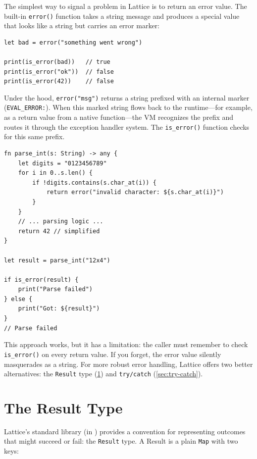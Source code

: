 The simplest way to signal a problem in Lattice is to return an error value. The built-in \lstinline|error()| function takes a string message and produces a special value that looks like a string but carries an error marker:

\begin{lstlisting}[language=Lattice, caption={Creating and detecting error values}]
let bad = error("something went wrong")

print(is_error(bad))   // true
print(is_error("ok"))  // false
print(is_error(42))    // false
\end{lstlisting}

Under the hood, \lstinline|error("msg")| returns a string prefixed with an internal marker (\lstinline|EVAL_ERROR:|). When this marked string flows back to the runtime---for example, as a return value from a native function---the VM recognizes the prefix and routes it through the exception handler system. The \lstinline|is_error()| function checks for this same prefix.

\begin{lstlisting}[language=Lattice, caption={Using error() in a function}]
fn parse_int(s: String) -> any {
    let digits = "0123456789"
    for i in 0..s.len() {
        if !digits.contains(s.char_at(i)) {
            return error("invalid character: ${s.char_at(i)}")
        }
    }
    // ... parsing logic ...
    return 42 // simplified
}

let result = parse_int("12x4")

if is_error(result) {
    print("Parse failed")
} else {
    print("Got: ${result}")
}
// Parse failed
\end{lstlisting}

This approach works, but it has a limitation: the caller must remember to check \lstinline|is_error()| on every return value. If you forget, the error value silently masquerades as a string. For more robust error handling, Lattice offers two better alternatives: the \lstinline|Result| type (\cref{sec:result-type}) and \lstinline|try/catch| (\cref{sec:try-catch}).

\section{The Result Type}\label{sec:result-type}

Lattice's standard library (in ) provides a convention for representing outcomes that might succeed or fail: the \lstinline|Result| type. A Result is a plain \lstinline|Map| with two keys:

